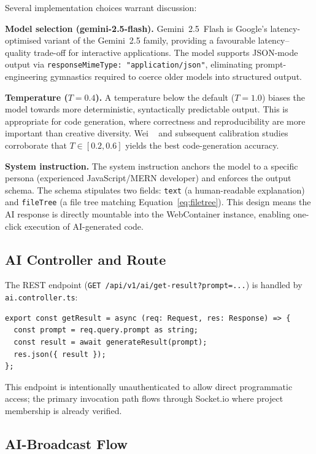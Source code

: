 Several implementation choices warrant discussion:

\textbf{Model selection (gemini-2.5-flash).}
Gemini~2.5~Flash is Google's latency-optimised variant of the Gemini~2.5
family, providing a favourable latency--quality trade-off for interactive
applications. The model supports JSON-mode output via
\texttt{responseMimeType: "application/json"}, eliminating prompt-engineering
gymnastics required to coerce older models into structured output.

\textbf{Temperature ($T = 0.4$).}
A temperature below the default ($T = 1.0$) biases the model towards more
deterministic, syntactically predictable output. This is appropriate for code
generation, where correctness and reproducibility are more important than
creative diversity. Wei \etal~\cite{wei2022chain} and subsequent calibration
studies corroborate that $T \in [0.2, 0.6]$ yields the best code-generation
accuracy.

\textbf{System instruction.}
The system instruction anchors the model to a specific persona (experienced
JavaScript/MERN developer) and enforces the output schema. The schema
stipulates two fields: \texttt{text} (a human-readable explanation) and
\texttt{fileTree} (a file tree matching Equation~\ref{eq:filetree}). This
design means the AI response is directly mountable into the WebContainer
instance, enabling one-click execution of AI-generated code.

\subsection{AI Controller and Route}

The REST endpoint (\texttt{GET /api/v1/ai/get-result?prompt=...}) is handled
by \texttt{ai.controller.ts}:

\begin{lstlisting}[caption={AI controller (\texttt{ai.controller.ts}).},
  label=lst:aictl]
export const getResult = async (req: Request, res: Response) => {
  const prompt = req.query.prompt as string;
  const result = await generateResult(prompt);
  res.json({ result });
};
\end{lstlisting}

This endpoint is intentionally unauthenticated to allow direct programmatic
access; the primary invocation path flows through Socket.io where project
membership is already verified.

\subsection{AI-Broadcast Flow}

